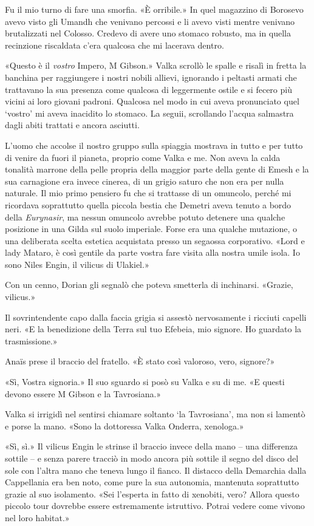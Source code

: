 Fu il mio turno di fare una smorfia. «È orribile.» In quel magazzino di
Borosevo avevo visto gli Umandh che venivano percossi e li avevo visti
mentre venivano brutalizzati nel Colosso. Credevo di avere uno stomaco
robusto, ma in quella recinzione riscaldata c'era qualcosa che mi
lacerava dentro.

«Questo è il \emph{vostro} Impero, M Gibson.» Valka scrollò le spalle e
risalì in fretta la banchina per raggiungere i nostri nobili allievi,
ignorando i peltasti armati che trattavano la sua presenza come qualcosa
di leggermente ostile e si fecero più vicini ai loro giovani padroni.
Qualcosa nel modo in cui aveva pronunciato quel `vostro' mi aveva
inacidito lo stomaco. La seguii, scrollando l'acqua salmastra dagli
abiti trattati e ancora asciutti.

L'uomo che accolse il nostro gruppo sulla spiaggia mostrava in tutto e
per tutto di venire da fuori il pianeta, proprio come Valka e me. Non
aveva la calda tonalità marrone della pelle propria della maggior parte
della gente di Emesh e la sua carnagione era invece cinerea, di un
grigio saturo che non era per nulla naturale. Il mio primo pensiero fu
che si trattasse di un omuncolo, perché mi ricordava soprattutto quella
piccola bestia che Demetri aveva tenuto a bordo della \emph{Eurynasir},
ma nessun omuncolo avrebbe potuto detenere una qualche posizione in una
Gilda sul suolo imperiale. Forse era una qualche mutazione, o una
deliberata scelta estetica acquistata presso un segaossa corporativo.
«Lord e lady Mataro, è così gentile da parte vostra fare visita alla
nostra umile isola. Io sono Niles Engin, il vilicus di Ulakiel.»

Con un cenno, Dorian gli segnalò che poteva smetterla di inchinarsi.
«Grazie, vilicus.»

Il sovrintendente capo dalla faccia grigia si assestò nervosamente i
ricciuti capelli neri. «E la benedizione della Terra sul tuo Efebeia,
mio signore. Ho guardato la trasmissione.»

Anaïs prese il braccio del fratello. «È stato così valoroso, vero,
signore?»

«Sì, Vostra signoria.» Il suo sguardo si posò su Valka e su di me. «E
questi devono essere M Gibson e la Tavrosiana.»

Valka si irrigidì nel sentirsi chiamare soltanto `la Tavrosiana', ma non
si lamentò e porse la mano. «Sono la dottoressa Valka Onderra,
xenologa.»

«Sì, sì.» Il vilicus Engin le strinse il braccio invece della mano --
una differenza sottile -- e senza parere tracciò in modo ancora più
sottile il segno del disco del sole con l'altra mano che teneva lungo il
fianco. Il distacco della Demarchia dalla Cappellania era ben noto, come
pure la sua autonomia, mantenuta soprattutto grazie al suo isolamento.
«Sei l'esperta in fatto di xenobiti, vero? Allora questo piccolo tour
dovrebbe essere estremamente istruttivo. Potrai vedere come vivono nel
loro habitat.»


